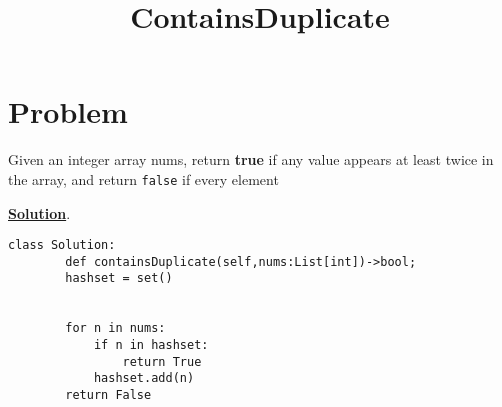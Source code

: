 \documentclass{article}
\title{ContainsDuplicate}
\begin{document}
\maketitle
\section{Problem}
Given an integer array nums, return  \textbf{true} if any value appears at least twice in the array, and return \texttt{false} if every element
\begin{center}
\textbf{\Large\underline{Solution}}.
\end{center}
\begin{verbatim}
class Solution:
        def containsDuplicate(self,nums:List[int])->bool;
        hashset = set()


        for n in nums:
            if n in hashset:
                return True
            hashset.add(n)
        return False
\end{verbatim}
\end{document}
